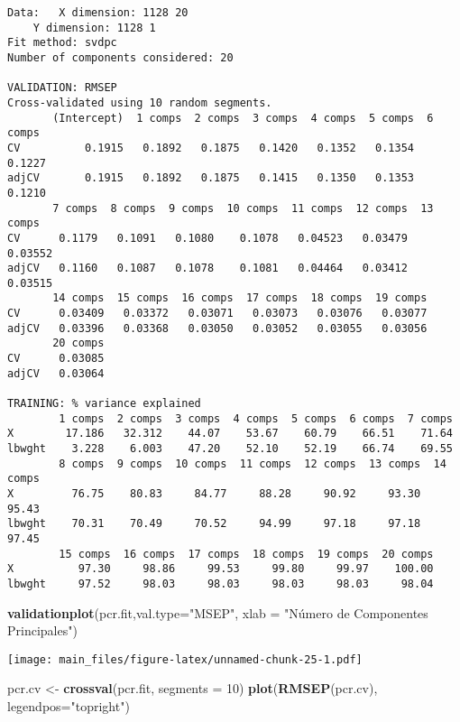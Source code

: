 \documentclass[]{article}
\newenvironment{Shaded}{\begin{snugshade}}{\end{snugshade}}
\newcommand{\KeywordTok}[1]{\textcolor[rgb]{0.13,0.29,0.53}{\textbf{#1}}}
\newcommand{\DataTypeTok}[1]{\textcolor[rgb]{0.13,0.29,0.53}{#1}}
\newcommand{\DecValTok}[1]{\textcolor[rgb]{0.00,0.00,0.81}{#1}}
\newcommand{\StringTok}[1]{\textcolor[rgb]{0.31,0.60,0.02}{#1}}
\newcommand{\NormalTok}[1]{#1}
\begin{document}
\begin{verbatim}
Data:   X dimension: 1128 20 
    Y dimension: 1128 1
Fit method: svdpc
Number of components considered: 20

VALIDATION: RMSEP
Cross-validated using 10 random segments.
       (Intercept)  1 comps  2 comps  3 comps  4 comps  5 comps  6 comps
CV          0.1915   0.1892   0.1875   0.1420   0.1352   0.1354   0.1227
adjCV       0.1915   0.1892   0.1875   0.1415   0.1350   0.1353   0.1210
       7 comps  8 comps  9 comps  10 comps  11 comps  12 comps  13 comps
CV      0.1179   0.1091   0.1080    0.1078   0.04523   0.03479   0.03552
adjCV   0.1160   0.1087   0.1078    0.1081   0.04464   0.03412   0.03515
       14 comps  15 comps  16 comps  17 comps  18 comps  19 comps
CV      0.03409   0.03372   0.03071   0.03073   0.03076   0.03077
adjCV   0.03396   0.03368   0.03050   0.03052   0.03055   0.03056
       20 comps
CV      0.03085
adjCV   0.03064

TRAINING: % variance explained
        1 comps  2 comps  3 comps  4 comps  5 comps  6 comps  7 comps
X        17.186   32.312    44.07    53.67    60.79    66.51    71.64
lbwght    3.228    6.003    47.20    52.10    52.19    66.74    69.55
        8 comps  9 comps  10 comps  11 comps  12 comps  13 comps  14 comps
X         76.75    80.83     84.77     88.28     90.92     93.30     95.43
lbwght    70.31    70.49     70.52     94.99     97.18     97.18     97.45
        15 comps  16 comps  17 comps  18 comps  19 comps  20 comps
X          97.30     98.86     99.53     99.80     99.97    100.00
lbwght     97.52     98.03     98.03     98.03     98.03     98.04
\end{verbatim}

\begin{Shaded}
\begin{Highlighting}[]
\KeywordTok{validationplot}\NormalTok{(pcr.fit,}\DataTypeTok{val.type=}\StringTok{"MSEP"}\NormalTok{, }\DataTypeTok{xlab =} \StringTok{"Número de Componentes Principales"}\NormalTok{)}
\end{Highlighting}
\end{Shaded}

\texttt{[image: main\_files/figure-latex/unnamed-chunk-25-1.pdf]}

\begin{Shaded}
\begin{Highlighting}[]
\NormalTok{pcr.cv <-}\StringTok{ }\KeywordTok{crossval}\NormalTok{(pcr.fit, }\DataTypeTok{segments =} \DecValTok{10}\NormalTok{)}
\KeywordTok{plot}\NormalTok{(}\KeywordTok{RMSEP}\NormalTok{(pcr.cv), }\DataTypeTok{legendpos=}\StringTok{"topright"}\NormalTok{)}
\end{Highlighting}
\end{Shaded}
\end{document}
